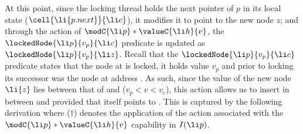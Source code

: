 \normalsize
%
At this point, since the locking thread holds the next pointer of $p$ in its local state ($\cell{\li{p.next}}{\li c}$), it modifies it to point to the new node $z$; and through the action of $\modC{\li p} * \valueC{\li h}{v}$, the $\lockedNode{\li p}{v_p}{\li c}$ predicate is updated as $\lockedNode{\li p}{v_p}{\li z}$. Recall that the $\lockedNode{\li p}{v_p}{\li c}$ predicate states that the node at  is locked, it holds value $v_p$ and prior to locking its successor was the node at address . As such, since the value of the new node $\li{z}$ lies between that of  and  ($v_p < v < v_c$), this action allows us to insert  in between  and  provided that  itself points to . This is captured by the following derivation where ($\dagger$) denotes the application of the action associated with the $\modC{\li p} * \valueC{\li h}{v}$ capability in $I(\li p)$.
%
\small
